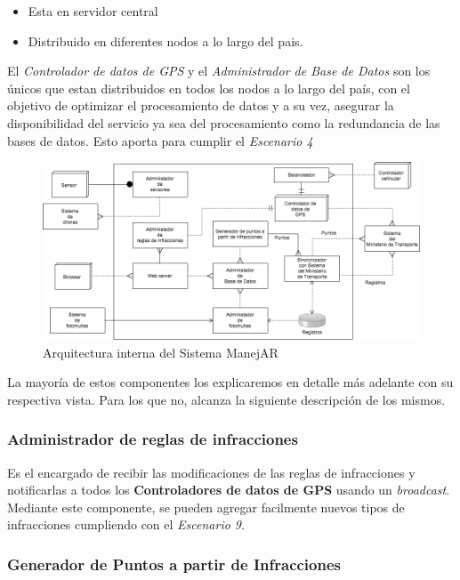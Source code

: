 \begin{itemize}
  \item Esta en servidor central
  \item Distribuido en diferentes nodos a lo largo del pais.  
\end{itemize}


El \textit{Controlador de datos de GPS} y el \textit{Administrador de Base de Datos} 
son los únicos que estan distribuidos en todos los nodos a lo largo del país, 
con el objetivo de optimizar el procesamiento de datos y a su vez, asegurar la 
disponibilidad del servicio ya sea del procesamiento como la redundancia de las bases de datos.
Esto aporta para cumplir el \textit{Escenario 4}


\begin{figure}
\centerline{\includegraphics[width=1\textwidth]{./imagenes/arquitectura_tp2/manejar.png}}
\caption{Arquitectura interna del Sistema ManejAR}
\end{figure}

La mayoría de estos componentes los explicaremos en detalle más adelante con su 
respectiva vista. Para los que no, alcanza la siguiente descripción de los 
mismos.


\subsubsection{Administrador de reglas de infracciones}

Es el encargado de recibir las modificaciones de las reglas de infracciones y 
notificarlas a todos los \textbf{Controladores de datos de GPS} usando un \textit{broadcast}.
Mediante este componente, se pueden agregar facilmente nuevos tipos de 
infracciones cumpliendo con el \textit{Escenario 9}.

\subsubsection{Generador de Puntos a partir de Infracciones}

